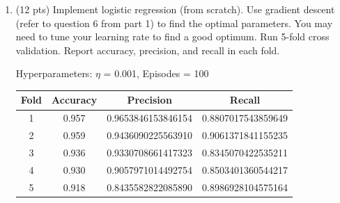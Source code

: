 \documentclass[a4paper]{article}
\theoremstyle{definition}
\newenvironment{soln}{
    \leavevmode\color{blue}\ignorespaces
}{}
\begin{document}
\begin{enumerate}
	\item (12 pts) Implement logistic regression (from scratch). Use gradient descent (refer to question 6 from part 1) to find the optimal parameters. You may need to tune your learning rate to find a good optimum. Run 5-fold cross validation. Report accuracy, precision, and recall in each fold.
	
	\begin{soln} Hyperparameters: $\eta$ = 0.001, Episodes = 100
        \begin{center}
            \begin{tabular}{| c | c | c | c |}
                \hline
                Fold & Accuracy & Precision & Recall \\
                \hline 1 & 0.957 & 0.9653846153846154 & 0.8807017543859649\\
                \hline 2 & 0.959 & 0.9436090225563910 & 0.9061371841155235\\
                \hline 3 & 0.936 & 0.9330708661417323 & 0.8345070422535211\\
                \hline 4 & 0.930 & 0.9057971014492754 & 0.8503401360544217\\
                \hline 5 & 0.918 & 0.8435582822085890 & 0.8986928104575164\\
                \hline
            \end{tabular}
        \end{center}
        \end{soln}


\end{enumerate}
\end{document}
